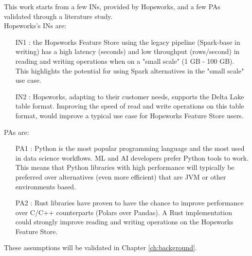This work starts from a few \glspl{IN}, provided by Hopsworks, and a few \glspl{PA} validated through a literature study. \\ Hopsworks's \glspl{IN} are:
\begin{itemize}
    \item[IN1 :] the Hopsworks Feature Store using the legacy pipeline (Spark-base in writing) has a high latency (seconds) and low throughput (rows/second) in reading and writing operations when on a "small scale" (1 GB - 100 GB). This highlights the potential for using Spark alternatives in the "small scale" use case.
    \item[IN2 :] Hopsworks, adapting to their customer needs, supports the Delta Lake table format. Improving the speed of read and write operations on this table format, would improve a typical use case for Hopsworks Feature Store users.
\end{itemize}
\glspl{PA} are:
\begin{itemize}
    \item[PA1 :] Python is the most popular programming language and the most used in data science workflows. \gls{ML} and \gls{AI} developers prefer Python tools to work. This means that Python libraries with high performance will typically be preferred over alternatives (even more efficient) that are \gls{JVM} or other environments based.
    \item[PA2 :] Rust libraries have proven to have the chance to improve performance over C/C++ counterparts (Polars over Pandas). A Rust implementation could strongly improve reading and writing operations on the Hopsworks Feature Store.
\end{itemize}
These assumptions will be validated in Chapter \ref{ch:background}. 

